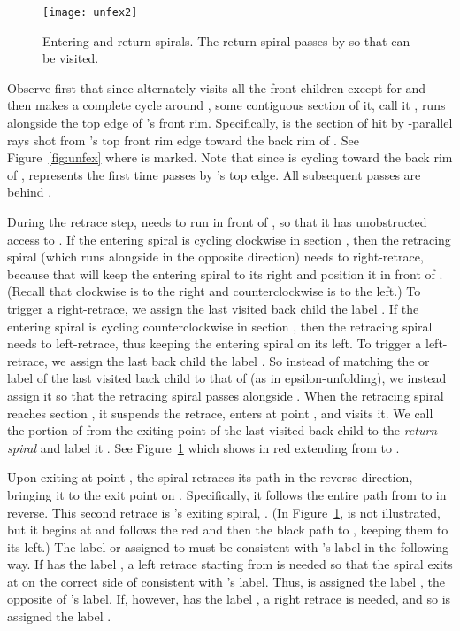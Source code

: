 \documentclass[11pt]{article}
\begin{document}
\begin{figure}[htbp]
\centering
\texttt{[image: unfex2]}
\caption{Entering and return spirals. The return spiral passes by  so that 
can be visited.}
\label{fig:unfex2}
\end{figure}


Observe first  that since  alternately visits all the front children
except for  and then makes a complete cycle
around ,
some contiguous section of it, call it , runs
alongside the top edge of 's front rim.
Specifically,  is the section of  hit by -parallel rays shot from
's top front rim edge toward the back rim of . See Figure~\ref{fig:unfex} where
 is marked. Note that since
 is cycling toward the back rim of ,  represents the first
time  passes by 's top edge.
All subsequent passes are behind .

During the retrace step,
  needs to run in front of , so that it has unobstructed
access to .
If the entering spiral
is cycling clockwise in section , then the retracing spiral (which runs alongside
 in the opposite direction) needs to
right-retrace, because that will keep the entering spiral to its right and
position it in front of .
(Recall that clockwise is to the right and counterclockwise is
to the left.)
To trigger a right-retrace, we assign the last visited back child the label .
If the entering spiral
is cycling counterclockwise in section , then the retracing spiral needs to
left-retrace, thus keeping the entering spiral on its left.
To trigger a left-retrace, we assign the last back child the label .
So instead of matching the  or  label of the last visited back
child to that of  (as in epsilon-unfolding),
we instead assign it so that the retracing spiral passes alongside .
When the retracing spiral reaches section , it suspends
the retrace, enters  at point , and visits it. We call the portion of 
from the exiting point of the last visited back child to  the
\emph{return spiral} and label it . See Figure~\ref{fig:unfex2}
which shows  in red extending from  to .


Upon exiting  at point , the spiral retraces its path
in the reverse direction, bringing it to the exit point  on .
Specifically, it follows the entire path from  to  in reverse.
This second retrace is 's exiting spiral, .
(In Figure~\ref{fig:unfex2},  is not illustrated, but
it begins at  and follows the red and then the black path
to , keeping them to its left.)
The label  or  assigned to  must be consistent
with 's label in the following way. If  has the label , a left retrace
starting from  is needed so that the spiral exits at  on
the correct side of  consistent with 's  label. Thus,
 is assigned the label , the opposite of 's label. If, however,  has the label ,
a right retrace is needed, and so  is assigned the label .
\end{document}
